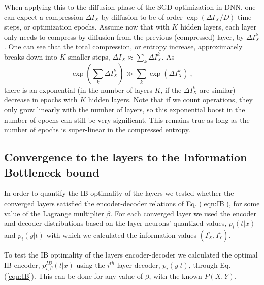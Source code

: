 \documentclass[11pt]{article}
\begin{document}
When applying this to the diffusion phase of the SGD optimization in DNN, one can expect a compression $\Delta I_X$ by diffusion to be of order $\exp(\Delta I_X/D)$ time steps, or optimization epochs.  Assume now that with $K$ hidden layers, each layer only needs to compress by diffusion from the previous (compressed) layer, by  $\Delta I^{k}_X$. One can see that the total compression, or entropy increase, approximately breaks down into $K$ smaller steps, $\Delta I_X \approx \sum_k \Delta  I^{k}_X$. As
\begin{equation}
\exp (\sum_k \Delta  I^{k}_X) \gg \sum_k \exp(\Delta  I^{k}_X) ~,
\end{equation}
 there is an exponential (in the number of layers $K$, if the $\Delta  I^{k}_X$ are similar) decrease in epochs with $K$ hidden layers. Note that if we count operations, they only grow linearly with the number of layers, so this exponential boost in the number of epochs can still be very significant. This remains true as long as the number of epochs is super-linear in the compressed entropy.


\subsection{Convergence to the layers to the Information Bottleneck bound}
\label{IB.optimal}

In order to quantify the IB optimality of the layers we tested whether the converged layers satisfied the encoder-decoder relations of Eq. (\ref{eqn:IB}), for some value of the Lagrange multiplier $\beta$.
For each converged layer we used the encoder and decoder distributions based on
the layer neurons' quantized values, $p_{i}\left(t|x\right)$ and $p_{i}\left(y|t\right)$
with which we calculated the information values $\left(I_{X}^{i},I_{Y}^{i}\right)$. 

To test the IB optimality of the layers encoder-decoder we calculated the optimal IB encoder, 
$p_{i,\beta}^{IB}\left(t|x\right)$
using the $i^{th}$ layer decoder, $p_{i}\left(y|t\right)$, through Eq.(\ref{eqn:IB}). 
This can be done for any value of $\beta$, with the known $P(X,Y)$. 
\end{document}
